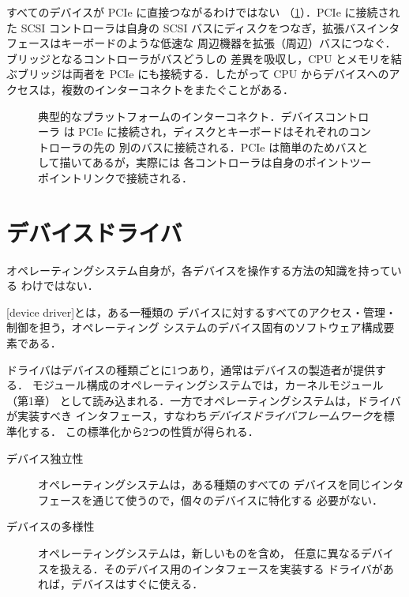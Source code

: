 \documentclass[../main.tex]{subfiles}
\begin{document}
すべてのデバイスが PCIe に直接つながるわけではない
（\cref{fig:l11-interconnect}）．PCIe に接続された SCSI コントローラは自身の
SCSI バスにディスクをつなぎ，拡張バスインタフェースはキーボードのような低速な
周辺機器を拡張（周辺）バスにつなぐ．ブリッジとなるコントローラがバスどうしの
差異を吸収し，CPU とメモリを結ぶブリッジは両者を PCIe にも接続する．したがって
CPU からデバイスへのアクセスは，複数のインターコネクトをまたぐことがある．%

\begin{figure}[htbp]
  \centering
  
  \caption{典型的なプラットフォームのインターコネクト．デバイスコントローラ
    は PCIe に接続され，ディスクとキーボードはそれぞれのコントローラの先の
    別のバスに接続される．PCIe は簡単のためバスとして描いてあるが，実際には
    各コントローラは自身のポイントツーポイントリンクで接続される．}
  \label{fig:l11-interconnect}
\end{figure}

\section{デバイスドライバ}
\label{sec:l11-drivers}

オペレーティングシステム自身が，各デバイスを操作する方法の知識を持っている
わけではない．

\begin{definition}[デバイスドライバ]
  [device driver]とは，ある一種類の
  デバイスに対するすべてのアクセス・管理・制御を担う，オペレーティング
  システムのデバイス固有のソフトウェア構成要素である．
\end{definition}

ドライバはデバイスの種類ごとに1つあり，通常はデバイスの製造者が提供する．
モジュール構成のオペレーティングシステムでは，カーネルモジュール（第1章）
として読み込まれる．一方でオペレーティングシステムは，ドライバが実装すべき
インタフェース，すなわち\emph{デバイスドライバフレームワーク}を標準化する．
この標準化から2つの性質が得られる．
\begin{description}
  \item[デバイス独立性] オペレーティングシステムは，ある種類のすべての
    デバイスを同じインタフェースを通じて使うので，個々のデバイスに特化する
    必要がない．
  \item[デバイスの多様性] オペレーティングシステムは，新しいものを含め，
    任意に異なるデバイスを扱える．そのデバイス用のインタフェースを実装する
    ドライバがあれば，デバイスはすぐに使える．
\end{description}
\end{document}
